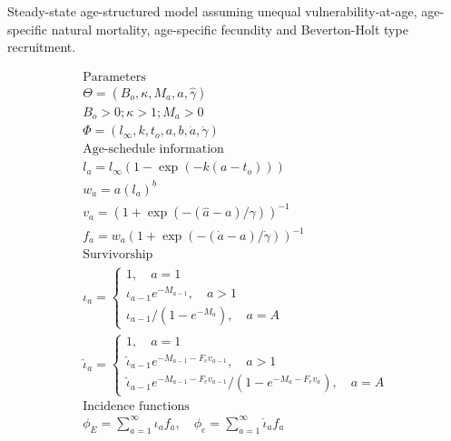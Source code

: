  

\begin{table}[!tbp]
\caption{Steady-state age-structured model assuming unequal
vulnerability-at-age, age-specific natural mortality, age-specific
fecundity and Beverton-Holt type recruitment.}\label{Table2} 
\tableEq
    \begin{gather}
           \hline
        \mbox{Parameters} \nonumber \\
            \Theta = (B_o,\kappa,M_a,\hat{a},\hat{\gamma}) \label{T2.1}\\
            B_o>0; \kappa > 1; M_a > 0\\
            \Phi = (l_\infty, k, t_o,a,b,\dot{a},\dot{\gamma}) \label{T2.3}\\[1ex]
        \mbox{Age-schedule information} \nonumber\\
            l_a=l_\infty(1-\exp(-k(a-t_o)))\label{T2.4}\\
            w_a=a(l_a)^b \label{T2.5}\\
            v_a=(1+\exp(-(\hat{a}-a)/\gamma))^{-1} \label{T2.6}\\
            f_a=w_a(1+\exp(-(\dot{a}-a)/\dot{\gamma}))^{-1} \label{T2.7}\\[1ex]
        \mbox{Survivorship} \nonumber\\
            \iota_a=\begin{cases} 1, \quad a=1      \label{T2.8} \\
            \iota_{a-1}e^{-M_{a-1}},\quad a>1\\
            \iota_{a-1}/(1-e^{-M_a}),\quad a=A \end{cases}\\
            \hat{\iota}_a=\begin{cases} 1, \quad a=1\\
            \hat{\iota}_{a-1}e^{-M_{a-1}-F_e v_{a-1}},\quad a>1\\
            \hat{\iota}_{a-1}e^{-M_{a-1}-F_e v_{a-1}}/(1-e^{-M_{a}-F_e v_{a}}),\quad a=A
            \end{cases} \label{T2.9}\\[1ex]
        \mbox{Incidence functions} \nonumber \\
            \phi_E=\sum_{a=1}^\infty \iota_a f_a, \quad
            \phi_e=\sum_{a=1}^\infty \hat{\iota}_a f_a \label{T2.10}\\

\end{gather}
\end{table}
